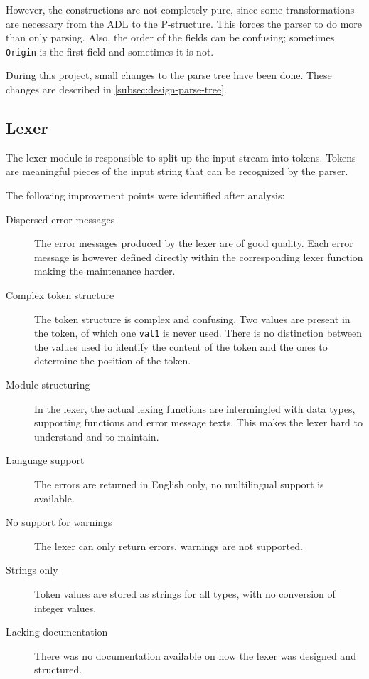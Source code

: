 However, the constructions are not completely pure, since some transformations are necessary from the ADL to the P-structure.
This forces the parser to do more than only parsing.
Also, the order of the fields can be confusing; sometimes \texttt{Origin} is the first field and sometimes it is not.

During this project, small changes to the parse tree have been done.
These changes are described in \autoref{subsec:design-parse-tree}.

\subsection{Lexer}
\label{subsec:analysis-lexer}
The lexer module is responsible to split up the input stream into tokens.
Tokens are meaningful pieces of the input string that can be recognized by the parser.

The following improvement points were identified after analysis:
\begin{description}
  \item[Dispersed error messages]
    The error messages produced by the lexer are of good quality.
    Each error message is however defined directly within the corresponding lexer function making the maintenance harder.
  \item[Complex token structure]
    The token structure is complex and confusing.
    Two values are present in the token, of which one \texttt{val1} is never used.
    There is no distinction between the values used to identify the content of the token and the ones to determine the position of the token.
  \item[Module structuring]
    In the lexer, the actual lexing functions are intermingled with data types, supporting functions and error message texts.
    This makes the lexer hard to understand and to maintain.
  \item[Language support]
    The errors are returned in English only, no multilingual support is available.
  \item[No support for warnings]
    The lexer can only return errors, warnings are not supported. 
  \item[Strings only]
    Token values are stored as strings for all types, with no conversion of integer values.
  \item[Lacking documentation]
    There was no documentation available on how the lexer was designed and structured.
\end{description}


